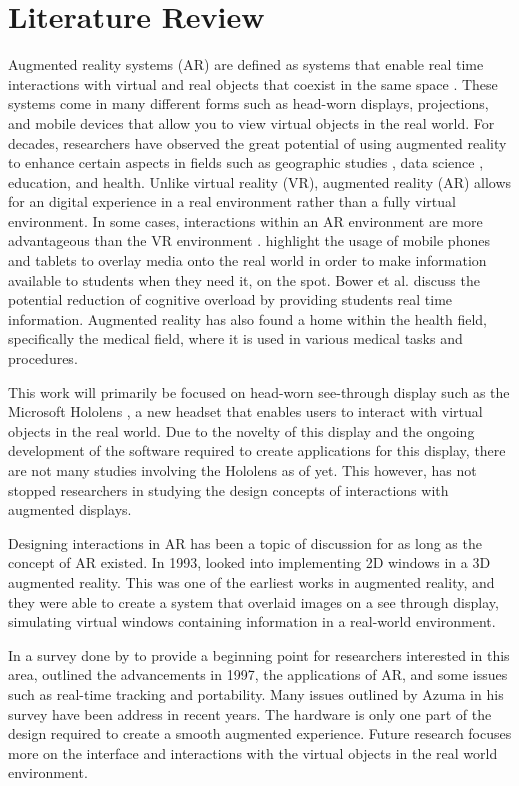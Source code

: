 \section{Literature Review}
\label{sec:literaturereview}
Augmented reality systems (AR) are defined as systems that enable real time interactions with virtual and real objects that coexist in the same space \cite{Azuma1997}. These systems come in many different forms such as head-worn displays, projections, and mobile devices that allow you to view virtual objects in the real world. For decades, researchers have observed the great potential of using augmented reality to enhance certain aspects in fields such as geographic studies \cite{Wang2018}, data science \cite{Zhang2018}, education, and health. Unlike virtual reality (VR), augmented reality (AR) allows for an digital experience in a real environment rather than a fully virtual environment. In some cases, interactions within an AR environment are more advantageous than the VR environment \cite{Krichenbauer2017}. \cite{Bower2014} highlight the usage of mobile phones and tablets to overlay media onto the real world in order to make information available to students when they need it, on the spot. Bower et al. discuss the potential reduction of cognitive overload by providing students real time information. Augmented reality has also found a home within the health field, specifically the medical field, where it is used in various medical tasks and procedures.

This work will primarily be focused on head-worn see-through display such as the Microsoft Hololens \cite{Hololens}, a new headset that enables users to interact with virtual objects in the real world. Due to the novelty of this display and the ongoing development of the software required to create applications for this display, there are not many studies involving the Hololens as of yet. This however, has not stopped researchers in studying the design concepts of interactions with augmented displays. 

Designing interactions in AR has been a topic of discussion for as long as the concept of AR existed. In 1993, \cite{Feiner1993} looked into implementing 2D windows in a 3D augmented reality. This was one of the earliest works in augmented reality, and they were able to create a system that overlaid images on a see through display, simulating virtual windows containing information in a real-world environment.

In a survey done by \cite{Azuma1997} to provide a beginning point for researchers interested in this area, outlined the advancements in 1997, the applications of AR, and some issues such as real-time tracking and portability. Many issues outlined by Azuma in his survey have been address in recent years. The hardware is only one part of the design required to create a smooth augmented experience. Future research focuses more on the interface and interactions with the virtual objects in the real world environment.

